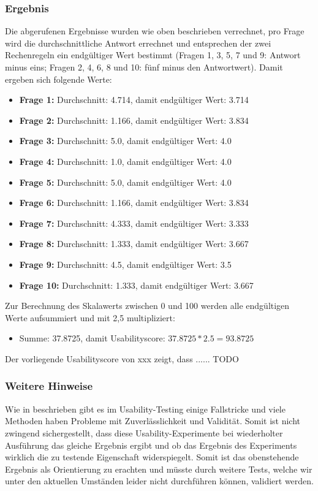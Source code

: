		\subsubsection{Ergebnis}
		Die abgerufenen Ergebnisse wurden wie oben beschrieben verrechnet, pro Frage wird die durchschnittliche Antwort errechnet und entsprechen der zwei Rechenregeln ein endgültiger Wert bestimmt (Fragen 1, 3, 5, 7 und 9: Antwort minus eins; Fragen 2, 4, 6, 8 und 10: fünf minus den Antwortwert). Damit ergeben sich folgende Werte:
		
		\begin{itemize}
			\item \textbf{Frage 1:} Durchschnitt: 4.714, damit endgültiger Wert: 3.714
			\item \textbf{Frage 2:} Durchschnitt: 1.166, damit endgültiger Wert: 3.834
			\item \textbf{Frage 3:} Durchschnitt: 5.0, damit endgültiger Wert: 4.0
			\item \textbf{Frage 4:} Durchschnitt: 1.0, damit endgültiger Wert: 4.0
			\item \textbf{Frage 5:} Durchschnitt: 5.0, damit endgültiger Wert: 4.0
			\item \textbf{Frage 6:} Durchschnitt: 1.166, damit endgültiger Wert: 3.834
			\item \textbf{Frage 7:} Durchschnitt: 4.333, damit endgültiger Wert: 3.333
			\item \textbf{Frage 8:} Durchschnitt: 1.333, damit endgültiger Wert: 3.667
			\item \textbf{Frage 9:} Durchschnitt: 4.5, damit endgültiger Wert: 3.5
			\item \textbf{Frage 10:} Durchschnitt: 1.333, damit endgültiger Wert: 3.667
		\end{itemize}
	
	Zur Berechnung des Skalawerts zwischen 0 und 100 werden alle endgültigen Werte aufsummiert und mit 2,5 multipliziert:
	
	\begin{itemize}
		\item Summe: 37.8725, damit Usabilityscore: $37.8725*2.5=93.8725$
	\end{itemize}

	Der vorliegende Usabilityscore von xxx zeigt, dass ...... TODO
	
	\subsubsection{Weitere Hinweise}
	Wie in \cite{Nielsen.20091993} beschrieben gibt es im Usability-Testing einige Fallstricke und viele Methoden haben Probleme mit Zuverlässlichkeit und Validität. Somit ist nicht zwingend sichergestellt, dass diese Usability-Experimente bei wiederholter Ausführung das gleiche Ergebnis ergibt und ob das Ergebnis des Experiments wirklich die zu testende Eigenschaft widerspiegelt. Somit ist das obenstehende Ergebnis als Orientierung zu erachten und müsste durch weitere Tests, welche wir unter den aktuellen Umständen leider nicht durchführen können, validiert werden.
	
